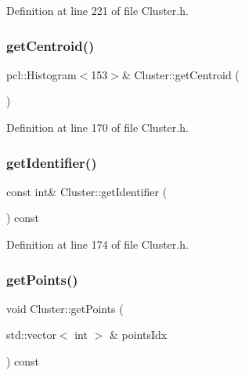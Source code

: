Definition at line 221 of file Cluster.\+h.

\mbox{\label{class_cluster_ad4e959d20fb0c9b208ee97e2082c51b1}} 
\subsubsection{\texorpdfstring{get\+Centroid()}{getCentroid()}}
{\footnotesize\ttfamily pcl\+::\+Histogram$<$153$>$\& Cluster\+::get\+Centroid (\begin{DoxyParamCaption}{ }\end{DoxyParamCaption})\hspace{0.3cm}{\ttfamily [inline]}}



Definition at line 170 of file Cluster.\+h.

\mbox{\label{class_cluster_a78429c346e1fdfe24fbd3863a16c924f}} 
\subsubsection{\texorpdfstring{get\+Identifier()}{getIdentifier()}}
{\footnotesize\ttfamily const int\& Cluster\+::get\+Identifier (\begin{DoxyParamCaption}{ }\end{DoxyParamCaption}) const\hspace{0.3cm}{\ttfamily [inline]}}



Definition at line 174 of file Cluster.\+h.

\mbox{\label{class_cluster_a77511825a9d51c343a20565a7e71a23c}} 
\subsubsection{\texorpdfstring{get\+Points()}{getPoints()}\hspace{0.1cm}{\footnotesize\ttfamily [1/2]}}
{\footnotesize\ttfamily void Cluster\+::get\+Points (\begin{DoxyParamCaption}\item[{std\+::vector$<$ int $>$ \&}]{points\+Idx }\end{DoxyParamCaption}) const}

